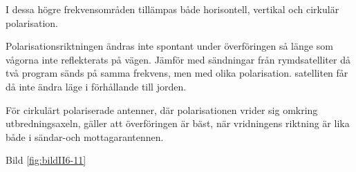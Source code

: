 I dessa högre frekvensområden tillämpas både horisontell, vertikal och
cirkulär polarisation.

Polarisationsriktningen ändras inte spontant under överföringen så
länge som vågorna inte reflekterats på vägen. Jämför med sändningar
från rymdsatelliter då två program sänds på samma frekvens, men med
olika polarisation. satelliten får då inte ändra läge i förhållande
till jorden.

För cirkulärt polariserade antenner, där polarisationen vrider sig
omkring utbredningsaxeln, gäller att överföringen är bäst, när
vridningens riktning är lika både i sändar-och mottagarantennen.

Bild \ref{fig:bildII6-11}

